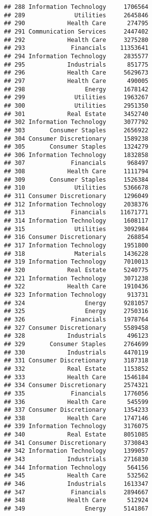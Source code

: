 \documentclass[
]{article}
\begin{document}
\begin{verbatim}
## 288 Information Technology     1706564
## 289              Utilities     2645846
## 290            Health Care      274795
## 291 Communication Services     2447402
## 292            Health Care     3275280
## 293             Financials    11353641
## 294 Information Technology     2835577
## 295            Industrials      851775
## 296            Health Care     5629673
## 297            Health Care      490005
## 298                 Energy     1678142
## 299              Utilities     1963267
## 300              Utilities     2951350
## 301            Real Estate     3452740
## 302 Information Technology     3077792
## 303       Consumer Staples     2656922
## 304 Consumer Discretionary     1589238
## 305       Consumer Staples     1324279
## 306 Information Technology     1832858
## 307             Financials      968497
## 308            Health Care     1111794
## 309       Consumer Staples     1526384
## 310              Utilities     5366678
## 311 Consumer Discretionary     1296049
## 312 Information Technology     2038376
## 313             Financials    11671771
## 314 Information Technology     1608117
## 315              Utilities     3092984
## 316 Consumer Discretionary      268854
## 317 Information Technology     1951800
## 318              Materials     1436228
## 319 Information Technology     7010013
## 320            Real Estate     5240775
## 321 Information Technology     3071238
## 322            Health Care     1910436
## 323 Information Technology      913731
## 324                 Energy     9281057
## 325                 Energy     2750316
## 326             Financials     1978764
## 327 Consumer Discretionary     5589458
## 328            Industrials      496123
## 329       Consumer Staples     2764699
## 330            Industrials     4470119
## 331 Consumer Discretionary     3187318
## 332            Real Estate     1153852
## 333            Health Care     1546184
## 334 Consumer Discretionary     2574321
## 335             Financials     1776056
## 336            Health Care      545599
## 337 Consumer Discretionary     1354233
## 338            Health Care     1747146
## 339 Information Technology     3176075
## 340            Real Estate     8051085
## 341 Consumer Discretionary     3730843
## 342 Information Technology     1399057
## 343            Industrials     2716830
## 344 Information Technology      564156
## 345            Health Care      532562
## 346            Industrials     1613347
## 347             Financials     2894667
## 348            Health Care      512924
## 349                 Energy     5141867

\end{verbatim}
\end{document}

